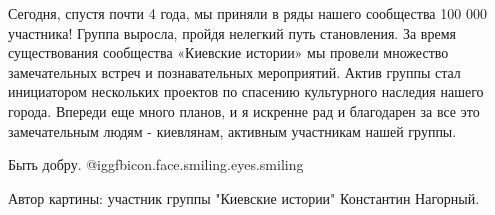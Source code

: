 Сегодня, спустя почти 4 года, мы приняли в ряды нашего сообщества 100 000
участника! Группа выросла, пройдя нелегкий путь становления. За время
существования сообщества «Киевские истории» мы провели множество замечательных
встреч и познавательных мероприятий. Актив группы стал инициатором нескольких
проектов по спасению культурного наследия нашего города. Впереди еще много
планов, и я искренне рад и благодарен за все это замечательным людям -
киевлянам, активным участникам нашей группы. 

Быть добру.  @igg{fbicon.face.smiling.eyes.smiling} 

Автор картины: участник группы "Киевские истории" Константин Нагорный.
